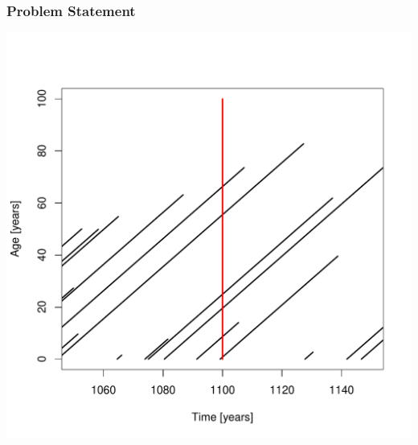 \documentclass{beamer}
\begin{document}
\begin{frame}
  \frametitle{Problem Statement}
    \begin{center}
      \includegraphics[height=.85\textheight]{lifeline_plot.pdf}
    \end{center}
\end{frame}
\end{document}
